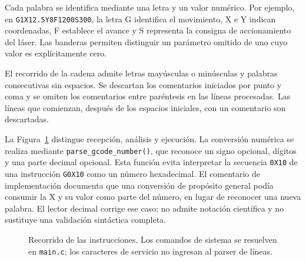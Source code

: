 \documentclass[blue,fullpaper]{ludusofficial}  %
\begin{document}
Cada palabra se identifica mediante una letra y
un valor numérico. Por ejemplo, en
\texttt{G1X12.5Y8F1200S300}, la letra G identifica
el movimiento, X e Y indican coordenadas, F establece
el avance y S representa la consigna de accionamiento
del láser. Las banderas permiten distinguir un parámetro
omitido de uno cuyo valor es explícitamente cero.

El recorrido de la cadena admite letras mayúsculas
o minúsculas y palabras consecutivas sin espacios.
Se descartan los comentarios iniciados por punto
y coma y se omiten los comentarios entre paréntesis
en las líneas procesadas. Las líneas que comienzan,
después de los espacios iniciales, con un comentario
son descartadas.

La Figura~\ref{fig:recepcion-parser} distingue recepción, análisis y ejecución. La conversión numérica se realiza mediante
\texttt{parse\_gcode\_number()}, que reconoce un signo
opcional, dígitos y una parte decimal opcional.
Esta función evita interpretar la secuencia
\texttt{0X10} de una instrucción \texttt{G0X10}
como un número hexadecimal. El comentario de implementación documenta que una conversión de propósito general podía consumir la X y su valor como parte del número, en lugar de reconocer una nueva palabra. El lector decimal corrige ese caso; no admite notación científica y no sustituye una validación sintáctica completa.

\begin{figure}[htbp]
\centering
{}
\caption{Recorrido de las instrucciones. Los comandos de sistema se resuelven en \texttt{main.c}; los caracteres de servicio no ingresan al parser de líneas.}
\label{fig:recepcion-parser}
\end{figure}
\end{document}
